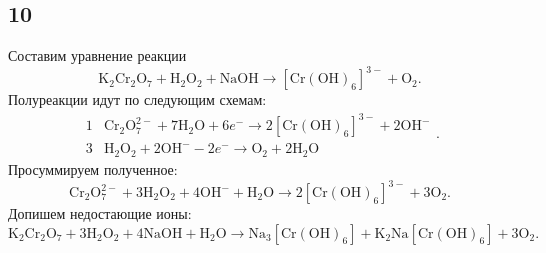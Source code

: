 \subsection{10}

Составим уравнение реакции
\[
\mathrm{K_2Cr_2O_7}+\mathrm{H_2O_2}+\mathrm{NaOH}\longrightarrow\mathrm{[Cr(OH)_6]^{3-}}+\mathrm{O_2}.
\]
Полуреакции идут по следующим схемам:
\[
\begin{array}{r|l}
	1 & \mathrm{Cr_2O_7^{2-}}+7\mathrm{H_2O}+6e^-\longrightarrow2\mathrm{[Cr(OH)_6]^{3-}}+2\mathrm{OH^{-}} \\
	3 & \mathrm{H_2O_2}+2\mathrm{OH^-}-2e^-\longrightarrow\mathrm{O_2}+2\mathrm{H_2O}
\end{array}.
\]
Просуммируем полученное:
\[
\mathrm{Cr_2O_7^{2-}}+3\mathrm{H_2O_2}+4\mathrm{OH^-}+\mathrm{H_2O}\longrightarrow2\mathrm{[Cr(OH)_6]^{3-}}+3\mathrm{O_2}.
\]
Допишем недостающие ионы:
\[
\mathrm{K_2Cr_2O_7}+3\mathrm{H_2O_2}+4\mathrm{NaOH}+\mathrm{H_2O}\longrightarrow\mathrm{Na_3[Cr(OH)_6]}+\mathrm{K_2Na[Cr(OH)_6]}+3\mathrm{O_2}.
\]